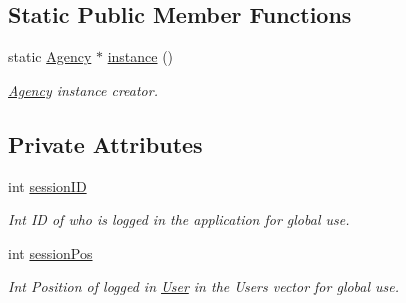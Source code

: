 \subsection*{Static Public Member Functions}
\begin{DoxyCompactItemize}
\item 
static \hyperlink{class_agency}{Agency} $\ast$ \hyperlink{group___agency_ga573fab41076b962289fad1f14031b68c}{instance} ()
\begin{DoxyCompactList}\small\item\em \hyperlink{class_agency}{Agency} instance creator. \end{DoxyCompactList}\end{DoxyCompactItemize}
\subsection*{Private Attributes}
\begin{DoxyCompactItemize}
\item 
int \hyperlink{group___agency_gadd64fcf15e317225aab8d7e66a113cdd}{session\+ID}
\begin{DoxyCompactList}\small\item\em Int ID of who is logged in the application for global use. \end{DoxyCompactList}\item 
int \hyperlink{group___agency_ga07004d662bede4bad0f673a0f93a9858}{session\+Pos}
\begin{DoxyCompactList}\small\item\em Int Position of logged in \hyperlink{class_user}{User} in the Users vector for global use. \end{DoxyCompactList}\end{DoxyCompactItemize}
